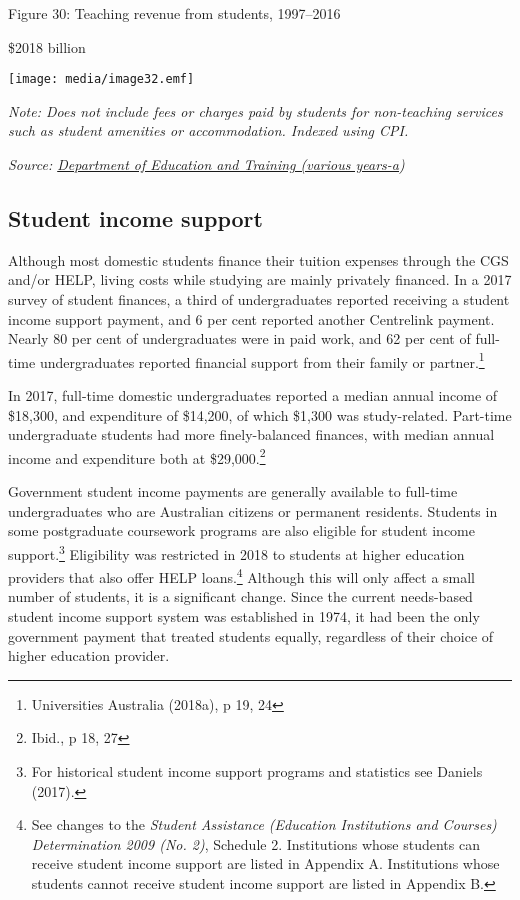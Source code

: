 \documentclass[]{book}
\begin{document}
\protect\hypertarget{_Ref311649015}{}{}Figure 30: Teaching revenue from students, 1997--2016

\$2018 billion

\texttt{[image: media/image32.emf]}

\emph{Note: Does not include fees or charges paid by students for non-teaching services such as student amenities or accommodation. Indexed using CPI.}

\emph{Source: \protect\hyperlink{_ENREF_88}{Department of Education and Training (various years-a})}

\hypertarget{student-income-support}{%
\subsection{Student income support}\label{student-income-support}}

Although most domestic students finance their tuition expenses through the CGS and/or HELP, living costs while studying are mainly privately financed. In a 2017 survey of student finances, a third of undergraduates reported receiving a student income support payment, and 6 per cent reported another Centrelink payment. Nearly 80 per cent of undergraduates were in paid work, and 62 per cent of full-time undergraduates reported financial support from their family or partner.\footnote{Universities Australia (2018a), p 19, 24}

In 2017, full-time domestic undergraduates reported a median annual income of \$18,300, and expenditure of \$14,200, of which \$1,300 was study-related. Part-time undergraduate students had more finely-balanced finances, with median annual income and expenditure both at \$29,000.\footnote{Ibid., p 18, 27}

Government student income payments are generally available to full-time undergraduates who are Australian citizens or permanent residents. Students in some postgraduate coursework programs are also eligible for student income support.\footnote{For historical student income support programs and statistics see Daniels (2017).} Eligibility was restricted in 2018 to students at higher education providers that also offer HELP loans.\footnote{See changes to the \emph{Student Assistance (Education Institutions and Courses) Determination 2009 (No. 2)}, Schedule 2. Institutions whose students can receive student income support are listed in Appendix A. Institutions whose students cannot receive student income support are listed in Appendix B.} Although this will only affect a small number of students, it is a significant change. Since the current needs-based student income support system was established in 1974, it had been the only government payment that treated students equally, regardless of their choice of higher education provider.
\end{document}
